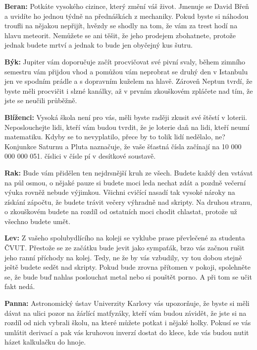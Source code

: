 \documentclass{CorpusOmne}
\begin{document}
\COzodiac
\begin{COcolumn}[2]
\textbf{Beran:}
Potkáte vysokého cizince, který změní váš život. Jmenuje se David Břeň a uvidíte ho jednou týdně na přednáškách z mechaniky. Pokud byste si náhodou troufli na nějakou nepřijít, hvězdy se shodly na tom, že vám za trest hodí na hlavu meteorit. Nemůžete se ani těšit, že jeho prodejem zbohatnete, protože jednak budete mrtví a jednak to bude jen obyčejný kus šutru.

\textbf{Býk:}
Jupiter vám doporučuje začít procvičovat své pivní svaly, během zimního semestru vám přijdou vhod a pomůžou vám neprobrat se druhý den v Istanbulu jen ve spodním prádle a s dopravním kuželem na hlavě. Zároveň Neptun tvrdí, že byste měli procvičit i slzné kanálky, až v prvním zkouškovém zpláčete nad tím, že jste se neučili průběžně.

\textbf{Blíženci:}
Vysoká škola není pro vás, měli byste raději zkusit své štěstí v loterii. Neposlouchejte lidi, kteří vám budou tvrdit, že je loterie daň na lidi, kteří neumí matematiku. Kdyby se to nevyplatilo, přece by to tolik lidí nedělalo, ne? Konjunkce Saturnu a Pluta naznačuje, že vaše šťastná čísla začínají na 10 000 000 000 051. číslici v čísle pí v desítkové soustavě.

\textbf{Rak:}
Bude vám přidělen ten nejdrsnější kruh ze všech. Budete každý den vstávat na půl osmou, o nějaké pauze si budete moci leda nechat zdát a pozdně večerní výuka rovněž nebude výjimkou. Všichni cvičící nasadí tak vysoké nároky na získání zápočtu, že budete trávit večery výhradně nad skripty. Na druhou stranu, o zkouškovém budete na rozdíl od ostatních moci chodit chlastat, protože už všechno budete umět.

\textbf{Lev:}
Z vašeho spolubydlícího na koleji se vyklube prase převlečené za studenta ČVUT. Přestože se ze začátku bude jevit jako sympaťák, brzo vás začnou rušit jeho ranní příchody na kolej. Tedy, ne že by vás vzbudily, vy tou dobou stejně ještě budete sedět nad skripty. Pokud bude zrovna přítomen v pokoji, spolehněte se, že bude buď nahlas poslouchat metal nebo si pouštět porno. A při tom se učit fakt nedá.

\textbf{Panna:}
Astronomický ústav Univerzity Karlovy vás upozorňuje, že byste si měli dávat na ulici pozor na žárlící matfyzáky, kteří vám budou závidět, že jste si na rozdíl od nich vybrali školu, na které můžete potkat i nějaké holky. Pokusí se vás umlátit derivací a pak vás kruhovou inverzí dostat do klece, kde vás budou nutit házet kalkulačku do hnoje.


\end{COcolumn}
\end{document}
